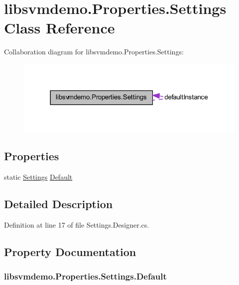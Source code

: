\hypertarget{classlibsvmdemo_1_1_properties_1_1_settings}{
\section{libsvmdemo.Properties.Settings Class Reference}
\label{classlibsvmdemo_1_1_properties_1_1_settings}
}


Collaboration diagram for libsvmdemo.Properties.Settings:
\nopagebreak
\begin{figure}[H]
\begin{center}
\leavevmode
\includegraphics[width=318pt]{classlibsvmdemo_1_1_properties_1_1_settings__coll__graph}
\end{center}
\end{figure}
\subsection*{Properties}
\begin{DoxyCompactItemize}
\item 
static \hyperlink{classlibsvmdemo_1_1_properties_1_1_settings}{Settings} \hyperlink{classlibsvmdemo_1_1_properties_1_1_settings_a084edb86c408be3f3f76a8c1464abc05}{Default}
\end{DoxyCompactItemize}


\subsection{Detailed Description}


Definition at line 17 of file Settings.Designer.cs.



\subsection{Property Documentation}
\hypertarget{classlibsvmdemo_1_1_properties_1_1_settings_a084edb86c408be3f3f76a8c1464abc05}{
\subsubsection[{Default}]{ libsvmdemo.Properties.Settings.Default}}
\label{classlibsvmdemo_1_1_properties_1_1_settings_a084edb86c408be3f3f76a8c1464abc05}


